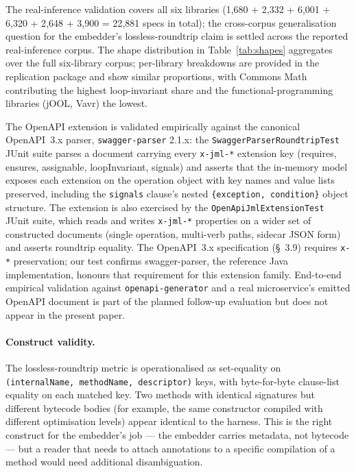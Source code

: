 The real-inference validation covers all six libraries (1{,}680 + 2{,}332 + 6{,}001 + 6{,}320 + 2{,}648 + 3{,}900 = 22{,}881 specs in total); the cross-corpus generalisation question for the embedder's lossless-roundtrip claim is settled across the reported real-inference corpus. The shape distribution in Table~\ref{tab:shapes} aggregates over the full six-library corpus; per-library breakdowns are provided in the replication package and show similar proportions, with Commons Math contributing the highest loop-invariant share and the functional-programming libraries (jOOL, Vavr) the lowest.

The OpenAPI extension is validated empirically against the canonical OpenAPI~3.x parser, \texttt{swagger-parser} 2.1.x: the \texttt{SwaggerParserRoundtripTest} JUnit suite parses a document carrying every \texttt{x-jml-*} extension key (requires, ensures, assignable, loopInvariant, signals) and asserts that the in-memory model exposes each extension on the operation object with key names and value lists preserved, including the \texttt{signals} clause's nested \texttt{\{exception, condition\}} object structure. The extension is also exercised by the \texttt{OpenApiJmlExtensionTest} JUnit suite, which reads and writes \texttt{x-jml-*} properties on a wider set of constructed documents (single operation, multi-verb paths, sidecar JSON form) and asserts roundtrip equality. The OpenAPI~3.x specification (\S~3.9) requires \texttt{x-*} preservation; our test confirms swagger-parser, the reference Java implementation, honours that requirement for this extension family. End-to-end empirical validation against \texttt{openapi-generator} and a real microservice's emitted OpenAPI document is part of the planned follow-up evaluation but does not appear in the present paper.

\paragraph{Construct validity.}
The lossless-roundtrip metric is operationalised as set-equality on \texttt{(internalName, methodName, descriptor)} keys, with byte-for-byte clause-list equality on each matched key. Two methods with identical signatures but different bytecode bodies (for example, the same constructor compiled with different optimisation levels) appear identical to the harness. This is the right construct for the embedder's job --- the embedder carries metadata, not bytecode --- but a reader that needs to attach annotations to a specific compilation of a method would need additional disambiguation.

